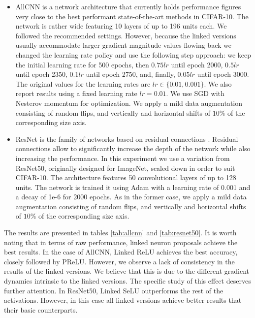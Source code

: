\documentclass[10pt,twocolumn,letterpaper]{article}
\begin{document}
\begin{itemize}
    \item AllCNN \cite{allcnn} is a network architecture that currently holds performance figures very close to the best performant state-of-the-art methods in CIFAR-10. The network is rather wide featuring 10 layers of up to 196 units each. We followed the recommended settings. However, because the linked versions usually accommodate larger gradient magnitude values flowing back we changed the learning rate policy and use the following step approach: we keep the initial learning rate for 500 epochs, then $0.75 lr$ until epoch 2000, $ 0.5 lr$ until epoch 2350, $0.1 lr$ until epoch 2750, and, finally,  $0.05 lr$ until epoch 3000. The original values for the learning rates are $lr \in \{0.01, 0.001\} $. We also report results using a fixed learning rate $lr = 0.01$. We use SGD with Nesterov momentum for optimization. We apply a mild data augmentation consisting of random flips, and vertically and horizontal shifts of $10\%$ of the corresponding size axis.
    
    \item 
    ResNet is the family of networks based on residual connections \cite{resnet}. Residual connections allow to significantly increase the depth of the network while also increasing the performance. In this experiment we use a variation from ResNet50, originally designed for ImageNet, scaled down in order to suit CIFAR-10. The architecture features 50 convolutional layers of up to 128 units. The network is trained it using Adam \cite{adam} with a learning rate of 0.001 and a decay of 1e-6 for 2000 epochs. As in the former case, we apply a mild data augmentation consisting of random flips, and vertically and horizontal shifts of $10\%$ of the corresponding size axis. 
\end{itemize}

The results are presented in tables \ref{tab:allcnn} and \ref{tab:resnet50}. It is worth noting that in terms of raw performance, linked neuron proposals achieve the best results. In the case of AllCNN, Linked ReLU achieves the best accuracy, closely followed by PReLU. However, we observe a lack of consistency in the results of the linked versions. We believe that this is due to the different gradient dynamics intrinsic to the linked versions. The specific study of this effect deserves further attention. In ResNet50, Linked SeLU outperforms the rest of the activations. However, in this case all linked versions achieve better results that their basic counterparts. 
\end{document}
